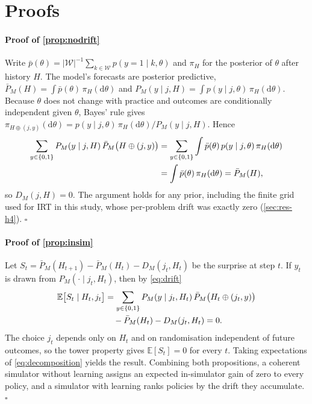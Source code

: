 \documentclass[a4paper,preprint,12pt,authoryear]{elsarticle}
\begin{document}


\appendix
\section{Proofs}\label{app:proofs}

\paragraph{Proof of \cref{prop:nodrift}} Write $\bar p(\theta)=|\mathcal W|^{-1}\sum_{k\in\mathcal W}p(y=1\mid k,\theta)$ and $\pi_H$ for the posterior of $\theta$ after history $H$. The model's forecasts are posterior predictive, $\bar P_M(H)=\int\bar p(\theta)\,\pi_H(\mathrm d\theta)$ and $P_M(y\mid j,H)=\int p(y\mid j,\theta)\,\pi_H(\mathrm d\theta)$. Because $\theta$ does not change with practice and outcomes are conditionally independent given $\theta$, Bayes' rule gives $\pi_{H\oplus(j,y)}(\mathrm d\theta)=p(y\mid j,\theta)\,\pi_H(\mathrm d\theta)/P_M(y\mid j,H)$. Hence
\begin{align}
\sum_{y\in\{0,1\}}P_M(y\mid j,H)\,\bar P_M\bigl(H\oplus(j,y)\bigr)
&=\sum_{y\in\{0,1\}}\int\bar p(\theta)\,p(y\mid j,\theta)\,\pi_H(\mathrm d\theta)\notag\\
&=\int\bar p(\theta)\,\pi_H(\mathrm d\theta)=\bar P_M(H),
\end{align}
so $D_M(j,H)=0$. The argument holds for any prior, including the finite grid used for IRT in this study, whose per-problem drift was exactly zero (\cref{sec:res-h4}). $\square$

\paragraph{Proof of \cref{prop:insim}} Let $S_t=\bar P_M(H_{t+1})-\bar P_M(H_t)-D_M(j_t,H_t)$ be the surprise at step $t$. If $y_t$ is drawn from $P_M(\cdot\mid j_t,H_t)$, then by \cref{eq:drift}
\begin{align}
\mathbb E\bigl[S_t\mid H_t,j_t\bigr]
&=\sum_{y\in\{0,1\}}P_M(y\mid j_t,H_t)\,\bar P_M\bigl(H_t\oplus(j_t,y)\bigr)\notag\\
&\quad-\bar P_M(H_t)-D_M(j_t,H_t)=0.
\end{align}
The choice $j_t$ depends only on $H_t$ and on randomisation independent of future outcomes, so the tower property gives $\mathbb E[S_t]=0$ for every $t$. Taking expectations of \cref{eq:decomposition} yields the result. Combining both propositions, a coherent simulator without learning assigns an expected in-simulator gain of zero to every policy, and a simulator with learning ranks policies by the drift they accumulate. $\square$
\end{document}
